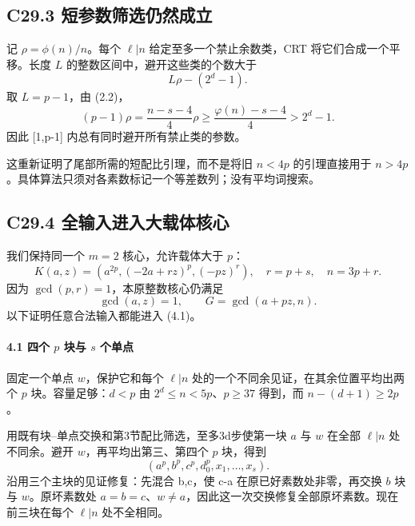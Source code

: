 \subsection*{\texorpdfstring{{C29.3} {短参数筛选仍然成立}}{C29.3 短参数筛选仍然成立}}\label{C29-h183}

{记} {\ensuremath{\rho =\phi (n)/n}。每个} {\ensuremath{\ell |n}} {给定至多一个禁止余数类，CRT} {将它们合成一个平移。长度} {\ensuremath{L}} {的整数区间中，避开这些类的个数大于} \[
L\rho-(2^d-1).
\] {取} {\ensuremath{L=p-1}，由} {(2.2)，} \[
(p-1)\rho
=\frac{n-s-4}{4}\rho
\ge\frac{\varphi(n)-s-4}{4}>2^d-1.
\tag{C29.3.1}
\] {因此} {{[}1,p-1{]}} {内总有同时避开所有禁止类的参数。}

{这重新证明了尾部所需的短配比引理，而不是将旧} {\ensuremath{n<4p}} {的引理直接用于} {\ensuremath{n>4p}。具体算法只须对各素数标记一个等差数列；没有平均词搜索。}

\subsection*{\texorpdfstring{{C29.4} {全输入进入大载体核心}}{C29.4 全输入进入大载体核心}}\label{C29-h184}

{我们保持同一个} {\ensuremath{m=2}} {核心，允许载体大于} {\ensuremath{p}：} \[
\boxed{
K(a,z)=(a^{2p},(-2a+rz)^p,(-pz)^r),\quad
r=p+s,\quad n=3p+r.}
\tag{C29.4.1}
\] {因为} {\ensuremath{\operatorname{gcd}(p,r)=1}，本原整数核心仍满足} \[
\gcd(a,z)=1,\qquad G=\gcd(a+pz,n).
\] {以下证明任意合法输入都能进入} {(4.1)。}

\paragraph*{\texorpdfstring{{4.1} {四个} {\ensuremath{p}} {块与} {\ensuremath{s}} {个单点}}{4.1 四个  块与  个单点}}\label{C29-h185}

{固定一个单点} {\ensuremath{w}，保护它和每个} {\ensuremath{\ell |n}} {处的一个不同余见证，在其余位置平均出两个} {\ensuremath{p}} {块。容量足够：\ensuremath{d<p}} {由} {\ensuremath{2^{d}\le n<5p}、\ensuremath{p\ge 37}} {得到，而} {\ensuremath{n-(d+1)\ge 2p}。}

{用既有块--单点交换和第3节配比筛选，至多3d步使第一块} {\ensuremath{a}} {与} {\ensuremath{w}} {在全部} {\ensuremath{\ell |n}} {处不同余。避开} {\ensuremath{w}，再平均出第三、第四个} {\ensuremath{p}} {块，得到} \[
(a^p,b^p,c^p,d_0^p,x_1,\ldots,x_s).
\] {沿用三个主块的见证修复：先混合} {b,c，使} {c-a} {在原已好素数处非零，再交换} {\ensuremath{b}} {块与} {\ensuremath{w}。原坏素数处} {\ensuremath{a=b=c}、\ensuremath{w\ne a}，因此这一次交换修复全部原坏素数。现在前三块在每个} {\ensuremath{\ell |n}} {处不全相同。}

